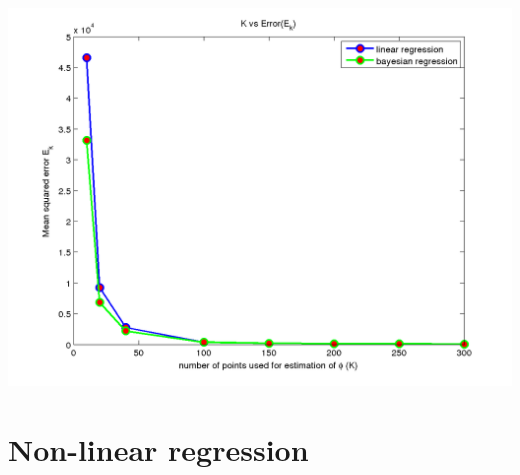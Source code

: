 \documentclass[fleqn]{article}
\begin{document}
\includegraphics[scale=0.6]{./pics/task3/linear_bayes_regression_error_vs_k.png}

\newpage
\section{Non-linear regression}
\end{document}
